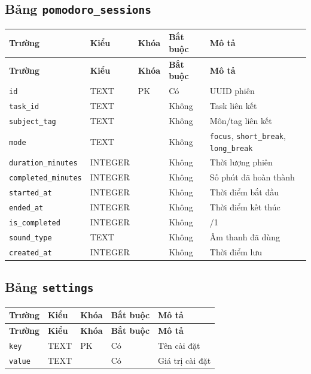 \documentclass[12pt,a4paper]{report}
\begin{document}
\subsection{Bảng \texttt{pomodoro\_sessions}}

\begin{longtable}{|>{\raggedright\arraybackslash}p{}|>{\raggedright\arraybackslash}p{}|>{\raggedright\arraybackslash}p{}|>{\raggedright\arraybackslash}p{}|>{\raggedright\arraybackslash}p{}|}
\hline
\textbf{Trường} & \textbf{Kiểu} & \textbf{Khóa} & \textbf{Bắt buộc} & \textbf{Mô tả} \\ \hline
\endfirsthead
\hline
\textbf{Trường} & \textbf{Kiểu} & \textbf{Khóa} & \textbf{Bắt buộc} & \textbf{Mô tả} \\ \hline
\endhead
\texttt{id} & TEXT & PK & Có & UUID phiên \\ \hline
\texttt{task\_id} & TEXT &  & Không & Task liên kết \\ \hline
\texttt{subject\_tag} & TEXT &  & Không & Môn/tag liên kết \\ \hline
\texttt{mode} & TEXT &  & Không & \texttt{focus}, \texttt{short\_break}, \texttt{long\_break} \\ \hline
\texttt{duration\_minutes} & INTEGER &  & Không & Thời lượng phiên \\ \hline
\texttt{completed\_minutes} & INTEGER &  & Không & Số phút đã hoàn thành \\ \hline
\texttt{started\_at} & INTEGER &  & Không & Thời điểm bắt đầu \\ \hline
\texttt{ended\_at} & INTEGER &  & Không & Thời điểm kết thúc \\ \hline
\texttt{is\_completed} & INTEGER &  & Không & 0/1 \\ \hline
\texttt{sound\_type} & TEXT &  & Không & Âm thanh đã dùng \\ \hline
\texttt{created\_at} & INTEGER &  & Không & Thời điểm lưu \\ \hline
\end{longtable}

\subsection{Bảng \texttt{settings}}

\begin{longtable}{|>{\raggedright\arraybackslash}p{}|>{\raggedright\arraybackslash}p{}|>{\raggedright\arraybackslash}p{}|>{\raggedright\arraybackslash}p{}|>{\raggedright\arraybackslash}p{}|}
\hline
\textbf{Trường} & \textbf{Kiểu} & \textbf{Khóa} & \textbf{Bắt buộc} & \textbf{Mô tả} \\ \hline
\endfirsthead
\hline
\textbf{Trường} & \textbf{Kiểu} & \textbf{Khóa} & \textbf{Bắt buộc} & \textbf{Mô tả} \\ \hline
\endhead
\texttt{key} & TEXT & PK & Có & Tên cài đặt \\ \hline
\texttt{value} & TEXT &  & Có & Giá trị cài đặt \\ \hline
\end{longtable}
\end{document}
